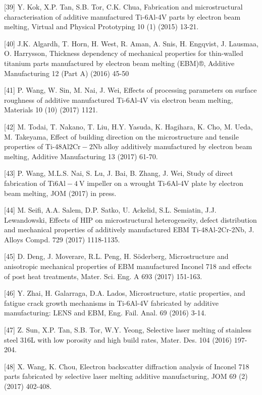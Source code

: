 \documentclass[10pt]{article}
\begin{document}
[39] Y. Kok, X.P. Tan, S.B. Tor, C.K. Chua, Fabrication and microstructural characterisation of additive manufactured Ti-6Al-4V parts by electron beam melting, Virtual and Physical Prototyping 10 (1) (2015) 13-21.

[40] J.K. Algardh, T. Horn, H. West, R. Aman, A. Snis, H. Engqvist, J. Lausmaa, O. Harrysson, Thickness dependency of mechanical properties for thin-walled titanium parts manufactured by electron beam melting (EBM)®, Additive Manufacturing 12 (Part A) (2016) 45-50

[41] P. Wang, W. Sin, M. Nai, J. Wei, Effects of processing parameters on surface roughness of additive manufactured Ti-6Al-4V via electron beam melting, Materials 10 (10) (2017) 1121.

[42] M. Todai, T. Nakano, T. Liu, H.Y. Yasuda, K. Hagihara, K. Cho, M. Ueda, M. Takeyama, Effect of building direction on the microstructure and tensile properties of Ti-48Al$2 \mathrm{Cr}-2 \mathrm{Nb}$ alloy additively manufactured by electron beam melting, Additive Manufacturing 13 (2017) 61-70.

[43] P. Wang, M.L.S. Nai, S. Lu, J. Bai, B. Zhang, J. Wei, Study of direct fabrication of Ti$6 \mathrm{Al}-4 \mathrm{~V}$ impeller on a wrought Ti-6Al-4V plate by electron beam melting, JOM (2017) in press.

[44] M. Seifi, A.A. Salem, D.P. Satko, U. Ackelid, S.L. Semiatin, J.J. Lewandowski, Effects of HIP on microstructural heterogeneity, defect distribution and mechanical properties of additively manufactured EBM Ti-48Al-2Cr-2Nb, J. Alloys Compd. 729 (2017) 1118-1135.

[45] D. Deng, J. Moverare, R.L. Peng, H. Söderberg, Microstructure and anisotropic mechanical properties of EBM manufactured Inconel 718 and effects of post heat treatments, Mater. Sci. Eng. A 693 (2017) 151-163.

[46] Y. Zhai, H. Galarraga, D.A. Lados, Microstructure, static properties, and fatigue crack growth mechanisms in Ti-6Al-4V fabricated by additive manufacturing: LENS and EBM, Eng. Fail. Anal. 69 (2016) 3-14.

[47] Z. Sun, X.P. Tan, S.B. Tor, W.Y. Yeong, Selective laser melting of stainless steel 316L with low porosity and high build rates, Mater. Des. 104 (2016) 197-204.

[48] X. Wang, K. Chou, Electron backscatter diffraction analysis of Inconel 718 parts fabricated by selective laser melting additive manufacturing, JOM 69 (2) (2017) 402-408.
\end{document}
